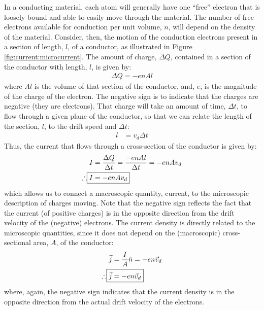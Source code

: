 In a conducting material, each atom will generally have one ``free'' electron that is loosely bound and able to easily move through the material. The number of free electrons available for conduction per unit volume, $n$, will depend on the density of the material. Consider, then, the motion of the conduction electrons present in a section of length, $l$, of a conductor, as illustrated in Figure \ref{fig:current:microcurrent}. The amount of charge, $\Delta Q$, contained in a section of the conductor with length, $l$, is given by:
\begin{align*}
\Delta Q= -e n Al
\end{align*}
where $Al$ is the volume of that section of the conductor, and, $e$, is the magnitude of the charge of the electron. The negative sign is to indicate that the charges are negative (they are electrons). That charge will take an amount of time, $\Delta t$, to flow through a given plane of the conductor, so that we can relate the length of the section, $l$, to the drift speed and $\Delta t$:
\begin{align*}
l&=v_d\Delta t
\end{align*}
Thus, the current that flows through a cross-section of the conductor is given by:
\begin{align*}
I&=\frac{\Delta Q}{\Delta t}=\frac{-e n Al}{\Delta t}=-enAv_d\\
\therefore\Aboxed{I&=-enAv_d}
\end{align*}
which allows us to connect a macroscopic quantity, current, to the microscopic description of charges moving. Note that the negative sign reflects the fact that the current (of positive charges) is in the opposite direction from the drift velocity of the (negative) electrons. The current density is directly related to the microscopic quantities, since it does not depend on the (macroscopic) cross-sectional area, $A$, of the conductor:
\begin{align*}
\vec j&=\frac{I}{A}\hat n = -en\vec v_d\\
\therefore \Aboxed{\vec j &= -en\vec v_d}
\end{align*}
where, again, the negative sign indicates that the current density is in the opposite direction from the actual drift velocity of the electrons.

